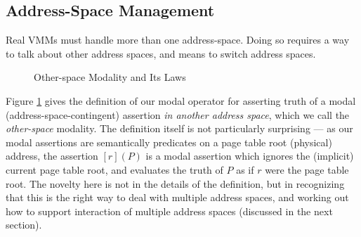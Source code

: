 \subsection{Address-Space Management}
\label{sec:aspacemanagement}
Real VMMs must
 handle more than one address-space.
Doing so requires a way to talk about other address spaces, and means to switch address spaces.
\begin{figure}
\footnotesize
{}
\vspace{-1em}
  \caption{Other-space Modality and Its Laws}
  \label{fig:modaldef}
\vspace{-1em}
  \end{figure}
Figure \ref{fig:modaldef} gives the definition of our modal operator for asserting truth of a modal
(address-space-contingent) assertion \emph{in another address space}, which we call
the \emph{other-space} modality. The definition itself is not
particularly surprising --- as our modal assertions are semantically predicates on a page table root (physical)
address, the assertion $[r](P)$ is a modal assertion which ignores the (implicit) current page table root,
and evaluates the truth of $P$ as if $r$ were the page table root. 
The novelty here is not in the details of the definition, but in recognizing that this is the right way to deal with
multiple address spaces, and working out how to support interaction of multiple address spaces (discussed in the next section).

